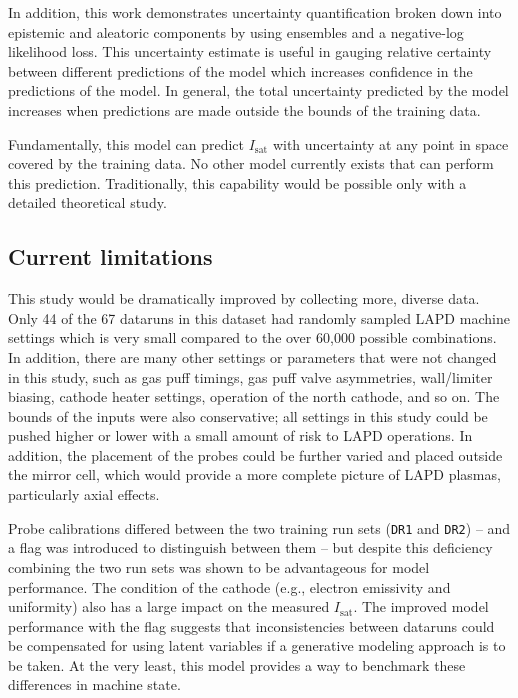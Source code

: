 In addition, this work demonstrates uncertainty quantification broken down into epistemic and aleatoric components by using ensembles and a negative-log likelihood loss. This uncertainty estimate is useful in gauging relative certainty between different predictions of the model which increases confidence in the predictions of the model. In general, the total uncertainty predicted by the model increases when predictions are made outside the bounds of the training data. 

Fundamentally, this model can predict $I_\text{sat}$ with uncertainty at any point in space covered by the training data. No other model currently exists that can perform this prediction. Traditionally, this capability would be possible only with a detailed theoretical study. 

\subsection{Current limitations}

This study would be dramatically improved by collecting more, diverse data. Only 44 of the 67 dataruns in this dataset had randomly sampled LAPD machine settings which is very small compared to the over 60,000 possible combinations. In addition, there are many other settings or parameters that were not changed in this study, such as gas puff timings, gas puff valve asymmetries, wall/limiter biasing, cathode heater settings, operation of the north cathode, and so on. The bounds of the inputs were also conservative; all settings in this study could be pushed higher or lower with a small amount of risk to LAPD operations. In addition, the placement of the probes could be further varied and placed outside the mirror cell, which would provide a more complete picture of LAPD plasmas, particularly axial effects.

Probe calibrations differed between the two training run sets (\texttt{DR1} and \texttt{DR2}) -- and a flag was introduced to distinguish between them -- but despite this deficiency combining the two run sets was shown to be advantageous for model performance. The condition of the cathode (e.g., electron emissivity and uniformity) also has a large impact on the measured $I_\text{sat}$. The improved model performance with the flag suggests that inconsistencies between dataruns could be compensated for using latent variables if a generative modeling approach is to be taken. At the very least, this model provides a way to benchmark these differences in machine state.


